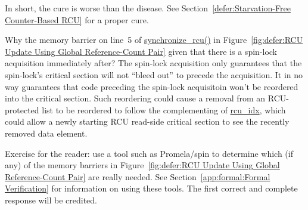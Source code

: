 	In short, the cure is worse than the disease.
	See Section~\ref{defer:Starvation-Free Counter-Based RCU}
	for a proper cure.

\QuickQ{}
	Why the memory barrier on line~5 of \url{synchronize_rcu()} in
	Figure~\ref{fig:defer:RCU Update Using Global Reference-Count Pair}
	given that there is a spin-lock acquisition immediately after?
\QuickA{}
	The spin-lock acquisition only guarantees that the spin-lock's
	critical section will not ``bleed out'' to precede the
	acquisition.
	It in no way guarantees that code preceding the spin-lock
	acquisitoin won't be reordered into the critical section.
	Such reordering could cause a removal from an RCU-protected
	list to be reordered to follow the complementing of
	\url{rcu_idx}, which could allow a newly starting RCU
	read-side critical section to see the recently removed
	data element.

	Exercise for the reader: use a tool such as Promela/spin
	to determine which (if any) of the memory barriers in
	Figure~\ref{fig:defer:RCU Update Using Global Reference-Count Pair}
	are really needed.
	See Section~\ref{app:formal:Formal Verification}
	for information on using these tools.
	The first correct and complete response will be credited.

